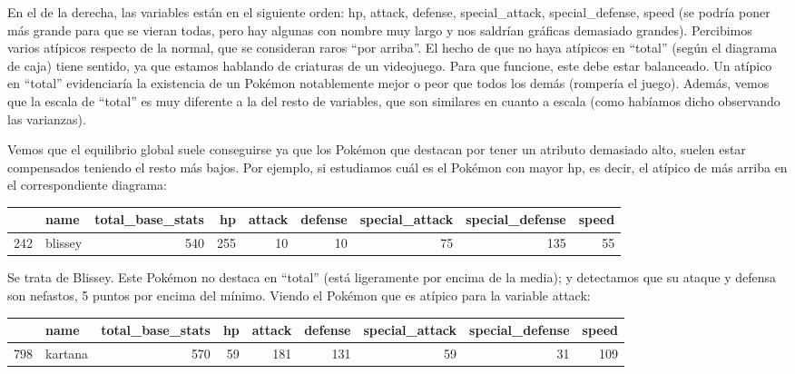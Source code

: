 \documentclass[
  12pt,
]{extreport}
\begin{document}
En el de la derecha, las variables están en el siguiente orden: hp,
attack, defense, special\_attack, special\_defense, speed (se podría
poner más grande para que se vieran todas, pero hay algunas con nombre
muy largo y nos saldrían gráficas demasiado grandes). Percibimos varios
atípicos respecto de la normal, que se consideran raros ``por arriba''.
El hecho de que no haya atípicos en ``total'' (según el diagrama de
caja) tiene sentido, ya que estamos hablando de criaturas de un
videojuego. Para que funcione, este debe estar balanceado. Un atípico en
``total'' evidenciaría la existencia de un Pokémon notablemente mejor o
peor que todos los demás (rompería el juego). Además, vemos que la
escala de ``total'' es muy diferente a la del resto de variables, que
son similares en cuanto a escala (como habíamos dicho observando las
varianzas).

Vemos que el equilibrio global suele conseguirse ya que los Pokémon que
destacan por tener un atributo demasiado alto, suelen estar compensados
teniendo el resto más bajos. Por ejemplo, si estudiamos cuál es el
Pokémon con mayor hp, es decir, el atípico de más arriba en el
correspondiente diagrama:

\begin{table}[H]
\centering\begingroup\fontsize{9.5}{11.5}\selectfont

\begin{tabular}{llrrrrrrr}
\toprule
  & name & total\_base\_stats & hp & attack & defense & special\_attack & special\_defense & speed\\
\midrule
242 & blissey & 540 & 255 & 10 & 10 & 75 & 135 & 55\\
\bottomrule
\end{tabular}
\endgroup{}
\end{table}

Se trata de Blissey. Este Pokémon no destaca en ``total'' (está
ligeramente por encima de la media); y detectamos que su ataque y
defensa son nefastos, 5 puntos por encima del mínimo. Viendo el Pokémon
que es atípico para la variable attack:

\begin{table}[H]
\centering\begingroup\fontsize{9.5}{11.5}\selectfont

\begin{tabular}{llrrrrrrr}
\toprule
  & name & total\_base\_stats & hp & attack & defense & special\_attack & special\_defense & speed\\
\midrule
798 & kartana & 570 & 59 & 181 & 131 & 59 & 31 & 109\\
\bottomrule
\end{tabular}
\endgroup{}
\end{table}
\end{document}

